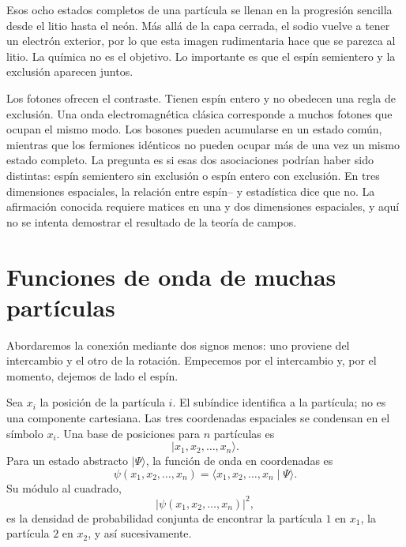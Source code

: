 Esos ocho estados completos de una partícula se llenan en la progresión sencilla desde el litio hasta el neón. Más allá de la capa cerrada, el sodio vuelve a tener un electrón exterior, por lo que esta imagen rudimentaria hace que se parezca al litio. La química no es el objetivo. Lo importante es que el espín semientero y la exclusión aparecen juntos.

Los fotones ofrecen el contraste. Tienen espín entero y no obedecen una regla de exclusión. Una onda electromagnética clásica corresponde a muchos fotones que ocupan el mismo modo. Los bosones pueden acumularse en un estado común, mientras que los fermiones idénticos no pueden ocupar más de una vez un mismo estado completo. La pregunta es si esas dos asociaciones podrían haber sido distintas: espín semientero sin exclusión o espín entero con exclusión. En tres dimensiones espaciales, la relación entre espín-- y estadística dice que no. La afirmación conocida requiere matices en una y dos dimensiones espaciales, y aquí no se intenta demostrar el resultado de la teoría de campos.

\begin{classroomqa}
\end{classroomqa}

\section{Funciones de onda de muchas partículas}

Abordaremos la conexión mediante dos signos menos: uno proviene del intercambio y el otro de la rotación. Empecemos por el intercambio y, por el momento, dejemos de lado el espín.

Sea \(x_i\) la posición de la partícula \(i\). El subíndice identifica a la partícula; no es una componente cartesiana. Las tres coordenadas espaciales se condensan en el símbolo \(x_i\). Una base de posiciones para \(n\) partículas es
\begin{equation}
\lvert x_1,x_2,\ldots,x_n\rangle.
\end{equation}
Para un estado abstracto \(\lvert\Psi\rangle\), la función de onda en coordenadas es
\begin{equation}
\psi(x_1,x_2,\ldots,x_n)
=
\langle x_1,x_2,\ldots,x_n\mid\Psi\rangle.
\end{equation}
Su módulo al cuadrado,
\begin{equation}
\bigl\lvert\psi(x_1,x_2,\ldots,x_n)\bigr\rvert^2,
\end{equation}
es la densidad de probabilidad conjunta de encontrar la partícula \(1\) en \(x_1\), la partícula \(2\) en \(x_2\), y así sucesivamente.

